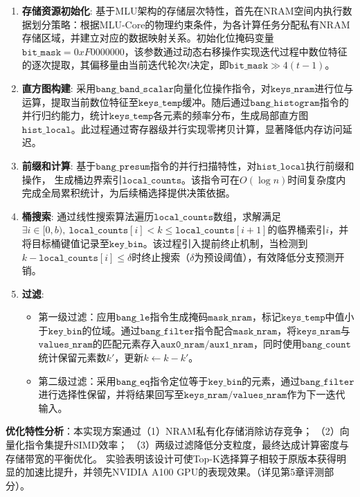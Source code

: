 \begin{enumerate}
\item \textbf{存储资源初始化}:
基于MLU架构的存储层次特性，首先在NRAM空间内执行数据划分策略：根据MLU-Core的物理约束条件，为各计算任务分配私有NRAM存储区域，并建立对应的数据映射关系。初始化位掩码变量$\mathtt{bit\_mask}=0xF0000000$，该参数通过动态右移操作实现迭代过程中数位特征的逐次提取，其偏移量由当前迭代轮次$t$决定，即$\mathtt{bit\_mask} \gg 4(t-1)$。

\item \textbf{直方图构建}:
采用$\mathtt{bang\_band\_scalar}$向量化位操作指令，对$\mathtt{keys\_nram}$进行位与运算，提取当前数位特征至$\mathtt{keys\_temp}$缓冲。随后通过$\mathtt{bang\_histogram}$指令的并行归约能力，统计$\mathtt{keys\_temp}$各元素的频率分布，生成局部直方图$\mathtt{hist\_local}$。此过程通过寄存器级并行实现零拷贝计算，显著降低内存访问延迟。

\item \textbf{前缀和计算}:
基于$\mathtt{bang\_presum}$指令的并行扫描特性，对$\mathtt{hist\_local}$执行前缀和操作，
生成桶边界索引$\mathtt{local\_counts}$。该指令可在$O(\log n)$时间复杂度内完成全局累积统计，为后续桶选择提供决策依据。

\item \textbf{桶搜索}:
通过线性搜索算法遍历$\mathtt{local\_counts}$数组，求解满足$ \exists i \in [0,b),\ \mathtt{local\_counts}[i] < k \leqslant \mathtt{local\_counts}[i+1] $的临界桶索引$i$，并将目标桶键值记录至$\mathtt{key\_bin}$。该过程引入提前终止机制，当检测到$k-\mathtt{local\_counts}[i] \leqslant \delta$时终止搜索（$\delta$为预设阈值），有效降低分支预测开销。

\item \textbf{过滤}:
\begin{itemize}
\item 第一级过滤：应用$\mathtt{bang\_le}$指令生成掩码$\mathtt{mask\_nram}$，标记$\mathtt{keys\_temp}$中值小于$\mathtt{key\_bin}$的位域。通过$\mathtt{bang\_filter}$指令配合$\mathtt{mask\_nram}$，将$\mathtt{keys\_nram}$与$\mathtt{values\_nram}$的匹配元素存入$\mathtt{aux0\_nram/aux1\_nram}$，同时使用$\mathtt{bang\_count}$统计保留元素数$k'$，更新$k \leftarrow k - k'$。
\item 第二级过滤：采用$\mathtt{bang\_eq}$指令定位等于$\mathtt{key\_bin}$的元素，通过$\mathtt{bang\_filter}$进行选择性保留，并将结果回写至$\mathtt{keys\_nram/values\_nram}$作为下一迭代输入。
\end{itemize}
\end{enumerate}

\textbf{优化特性分析}：本实现方案通过（1）NRAM私有化存储消除访存竞争；
（2）向量化指令集提升SIMD效率；
（3）两级过滤降低分支粒度，最终达成计算密度与存储带宽的平衡优化。
实验表明该设计可使Top-K选择算子相较于原版本获得明显的加速比提升，并领先NVIDIA A100 GPU的表现效果。（详见第5章评测部分）。

